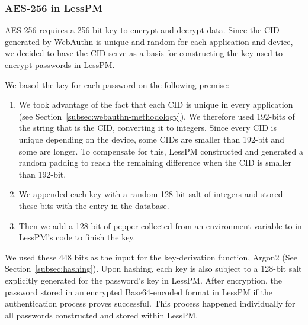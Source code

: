 \subsubsection{AES-256 in LessPM}
AES-256 requires a 256-bit key to encrypt and decrypt data.
Since the CID generated by WebAuthn is unique and random for each application
and device, we decided to have the CID serve as a basis for constructing the
key used to encrypt passwords in LessPM\@.

We based the key for each password on the following premise:
\begin{enumerate}
  \item
  We took advantage of the fact that each CID is unique in every application
  (see Section~\ref{subsec:webauthn-methodology}).
  We therefore used 192-bits of the string that is the CID\@, converting it to
  integers.
  Since every CID is unique depending on the device, some CIDs are smaller
  than 192-bit and some are longer.
  To compensate for this, LessPM constructed and generated a random padding
  to reach the remaining difference when the CID is smaller than 192-bit.
  \item
  We appended each key with a random 128-bit salt of integers and stored these
  bits with the entry in the database.
  \item
  Then we add a 128-bit of pepper collected from an environment variable to
  in LessPM's code to finish the key.
\end{enumerate}
We used these 448 bits as the input for the key-derivation function,
Argon2 (See Section~\ref{subsec:hashing}).
Upon hashing, each key is also subject to a 128-bit salt explicitly generated
for the password's key in LessPM\@.
After encryption, the password stored in an encrypted Base64-encoded format in
LessPM if the authentication process proves successful.
This process happened individually for all passwords constructed and stored
within LessPM\@.
